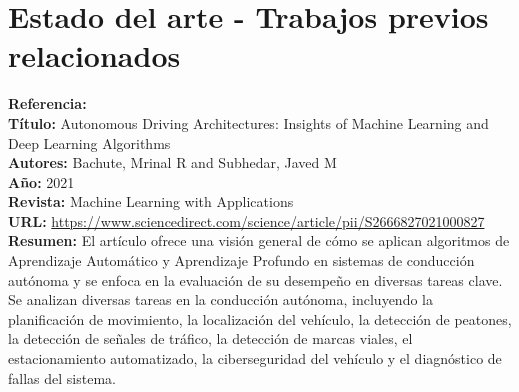 \documentclass[10pt,letterpaper,final]{article}
\begin{document}
    \section*{Estado del arte - Trabajos previos relacionados}
    \newline
    \begin{longtable}
        \hline
        \noindent \textbf{Referencia:}~\cite{bachute2021autonomous}                                    \\
        \textbf{Título:}
        Autonomous Driving Architectures: Insights of Machine Learning and Deep Learning Algorithms \\
        \textbf{Autores:}
        Bachute, Mrinal R and Subhedar, Javed M                                                        \\
        \textbf{Año:}
        2021                                                                                           \\
        \textbf{Revista:}
        Machine Learning with Applications                                                             \\
        \textbf{URL:}
        \url{https://www.sciencedirect.com/science/article/pii/S2666827021000827}                      \\
        \textbf{Resumen:}
        El artículo ofrece una visión general de cómo se aplican algoritmos de Aprendizaje Automático y Aprendizaje
        Profundo en sistemas de conducción autónoma y se enfoca en la evaluación de su desempeño en diversas tareas clave.
        Se analizan diversas tareas en la conducción autónoma, incluyendo la planificación de movimiento, la localización del vehículo,
        la detección de peatones, la detección de señales de tráfico, la detección de marcas viales, el estacionamiento automatizado,
        la ciberseguridad del vehículo y el diagnóstico de fallas del sistema.
        

\end{longtable}
\end{document}

